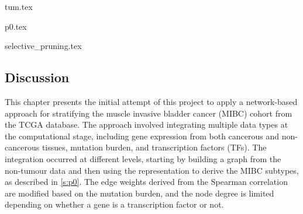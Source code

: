 {tum.tex}



{p0.tex}


{selective_pruning.tex}

\newpage

\subsection{Discussion}

This chapter presents the initial attempt of this project to apply a network-based approach for stratifying the muscle invasive bladder cancer (MIBC) cohort from the TCGA database. The approach involved integrating multiple data types at the computational stage, including gene expression from both cancerous and non-cancerous tissues, mutation burden, and transcription factors (TFs). The integration occurred at different levels, starting by building a graph from the non-tumour data and then using the representation to derive the MIBC subtypes, as described in \cref{s:p0}. The edge weights derived from the Spearman correlation are modified based on the mutation burden, and the node degree is limited depending on whether a gene is a transcription factor or not.

